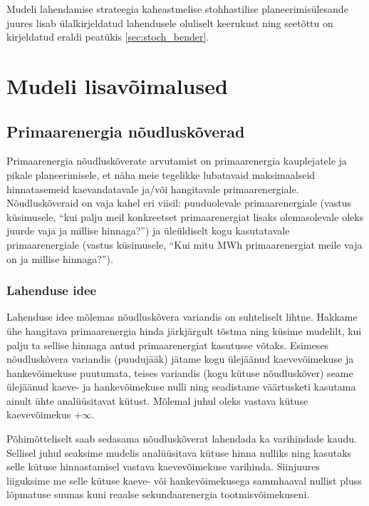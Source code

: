 \documentclass[10pt,a4paper]{article}
\begin{document}
Mudeli lahendamise strateegia kaheastmelise stohhastilise planeerimisülesande juures lisab ülalkirjeldatud lahendusele oluliselt keerukust ning seetõttu on kirjeldatud eraldi peatükis \ref{sec:stoch_bender}.

\section{Mudeli lisavõimalused}
\label{sec:lisad}
\subsection{Primaarenergia nõudluskõverad}
Primaarenergia nõudluskõverate arvutamist on primaarenergia kauplejatele ja pikale planeerimisele, et näha meie tegelikke lubatavaid maksimaalseid hinnatasemeid kaevandatavale ja/või hangitavale primaarenergiale. Nõudluskõveraid on vaja kahel eri viisil: puuduolevale primaarenergiale (vastus küsimusele, ``kui palju meil konkreetset primaarenergiat lisaks olemasolevale oleks juurde vaja ja millise hinnaga?'') ja üleüldiselt kogu kasutatavale primaarenergiale (vastus küsimusele, ``Kui mitu MWh primaarenergiat meile vaja on ja millise hinnaga?'').
\subsubsection{Lahenduse idee}
Lahenduse idee mõlemas nõudluskõvera variandis on suhteliselt lihtne. Hakkame ühe hangitava primaarenergia hinda järkjärgult tõstma ning küsime mudelilt, kui palju ta sellise hinnaga antud primaarenergiat kasutusse võtaks. Esimeses nõudluskõvera variandis (puudujääk) jätame kogu ülejäänud kaevevõimekuse ja hankevõimekuse puutumata, teises variandis (kogu kütuse nõudluskõver) seame ülejäänud kaeve- ja hankevõimekuse nulli ning seadistame väärtusketi kasutama ainult ühte analüüsitavat kütust. Mõlemal juhul oleks vastava kütuse kaevevõimekus $+\infty$.

Põhimõtteliselt saab sedasama nõudluskõverat lahendada ka varihindade kaudu. Sellisel juhul seaksime mudelis analüüsitava kütuse hinna nulliks ning kasutaks selle kütuse hinnastamisel vastava kaevevõimekuse varihinda. Siinjuures liiguksime me selle kütuse kaeve- või hankevõimekusega sammhaaval nullist pluss lõpmatuse suunas kuni reaalse sekundaarenergia tootmisvõimekuseni.
\end{document}
